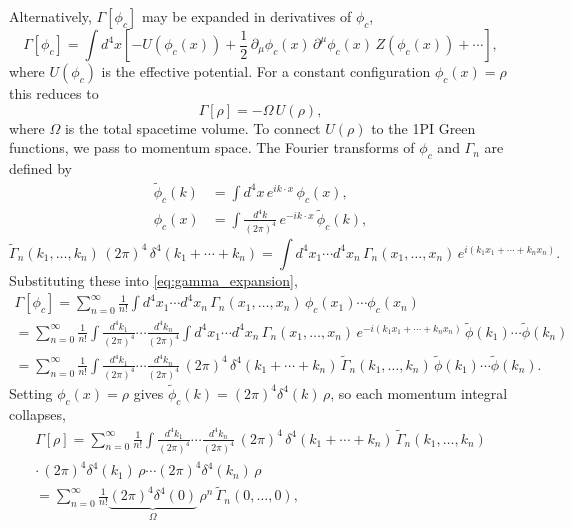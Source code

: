 Alternatively, $\Gamma[\phi_c]$ may be expanded in derivatives of
$\phi_c$,
\begin{equation}
	\Gamma[\phi_c] = \int d^4x\left[
		-U(\phi_c(x))
		+ \frac{1}{2}\,\partial_\mu\phi_c(x)\,\partial^\mu\phi_c(x)\,
		Z(\phi_c(x))
		+ \cdots\right],
\end{equation}
where $U(\phi_c)$ is the effective potential. For a constant configuration
$\phi_c(x) = \rho$ this reduces to
\begin{equation}
	\Gamma[\rho] = -\Omega\,U(\rho),
\end{equation}
where $\Omega$ is the total spacetime volume. To connect $U(\rho)$ to the
1PI Green functions, we pass to momentum space. The Fourier transforms
of $\phi_c$ and $\Gamma_n$ are defined by
\begin{align}
	\tilde{\phi}_c(k) & = \int d^4x\,e^{ik\cdot x}\,\phi_c(x),                          \\
	\phi_c(x)         & = \int\frac{d^4k}{(2\pi)^4}\,e^{-ik\cdot x}\,\tilde{\phi}_c(k),
\end{align}
\begin{equation}
	\tilde{\Gamma}_n(k_1,\ldots,k_n)\,(2\pi)^4\,\delta^4(k_1+\cdots+k_n)
	= \int d^4x_1\cdots d^4x_n\,\Gamma_n(x_1,\ldots,x_n)\,
	e^{i(k_1 x_1+\cdots+k_n x_n)}.
\end{equation}
Substituting these into \eqref{eq:gamma_expansion},
\begin{multline}
	\Gamma[\phi_c]
	= \sum_{n=0}^{\infty}\frac{1}{n!}
	\int d^4x_1\cdots d^4x_n\,
	\Gamma_n(x_1,\ldots,x_n)\,\phi_c(x_1)\cdots\phi_c(x_n) \\
	= \sum_{n=0}^{\infty}\frac{1}{n!}
	\int\frac{d^4k_1}{(2\pi)^4}\cdots\frac{d^4k_n}{(2\pi)^4}
	\int d^4x_1\cdots d^4x_n\,
	\Gamma_n(x_1,\ldots,x_n)\,
	e^{-i(k_1 x_1+\cdots+k_n x_n)}
	\,\tilde{\phi}(k_1)\cdots\tilde{\phi}(k_n) \\
	= \sum_{n=0}^{\infty}\frac{1}{n!}
	\int\frac{d^4k_1}{(2\pi)^4}\cdots\frac{d^4k_n}{(2\pi)^4}\,
	(2\pi)^4\,\delta^4(k_1+\cdots+k_n)\,
	\tilde{\Gamma}_n(k_1,\ldots,k_n)\,
	\tilde{\phi}(k_1)\cdots\tilde{\phi}(k_n).
	\label{eq:rewriting_Gamma}
\end{multline}
Setting $\phi_c(x) = \rho$ gives $\tilde{\phi}_c(k) =
	(2\pi)^4\delta^4(k)\,\rho$, so each momentum integral collapses,
\begin{multline}
	\Gamma[\rho]
	= \sum_{n=0}^{\infty}\frac{1}{n!}
	\int\frac{d^4k_1}{(2\pi)^4}\cdots\frac{d^4k_n}{(2\pi)^4}\,
	(2\pi)^4\,\delta^4(k_1+\cdots+k_n)\,
	\tilde{\Gamma}_n(k_1,\ldots,k_n) \\
	\cdot\,(2\pi)^4\delta^4(k_1)\,\rho\cdots(2\pi)^4\delta^4(k_n)\,\rho \\
	= \sum_{n=0}^{\infty}\frac{1}{n!}
	\underbrace{(2\pi)^4\delta^4(0)}_{\Omega}\,
	\rho^n\,\tilde{\Gamma}_n(0,\ldots,0),
\end{multline}
